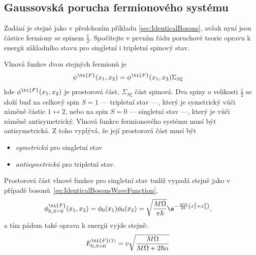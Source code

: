 \subsection{Gaussovská porucha fermionového systému}
\label{sec:GaussovskaPoruchaFermiony}
	Zadání je stejné jako v předchozím příkladu \ref{sec:IdenticalBosons}, avšak nyní jsou částice fermiony se spinem $\frac{1}{2}$.
	Spočítejte v prvním řádu poruchové teorie opravu k energii základního stavu pro singletní i tripletní spinový stav.
	
\begin{solution}
	Vlnová funkce dvou stejných fermionů je
	\begin{equation}
		\psi^{\ti{F}}(x_{1},x_{2})
			=\phi^{\ti{F}}(x_{1},x_{2})\Sigma_{S\xi}
	\end{equation}
	kde $\phi^{\ti{F}}(x_{1},x_{2})$ je prostorová část, $\Sigma_{S\xi}$ část spinová.
	Dva spiny o velikosti $\frac{1}{2}$ se složí buď na celkový spin $S=1$ --- tripletní stav ---, který je symetrický vůči záměně částic $1\leftrightarrow2$, nebo na spin $S=0$ --- singletní
	stav ---, který je vůči záměně antisymetrický.
	Vlnová funkce fermionového systému musí být antisymetrická.
	Z toho vyplývá, že její prostorová část musí být
	\begin{itemize}
		\item \emph{symetrická} pro singletní stav
		\item \emph{antisymetrická} pro tripletní stav.
	\end{itemize}
	Prostorová část vlnové funkce pro singletní stav tudíž vypadá stejně jako v případě bosonů~\eqref{eq:IdenticalBosonsWaveFunction},
	\begin{equation}
		\phi^{\ti{F}}_{0,S=0}(x_{1},x_{2})
			=\phi_{0}(x_{1})\phi_{0}(x_{2})
			=\sqrt{\frac{M\Omega}{\pi\hbar}}\e^{-\frac{M\Omega}{2\hbar}\left(x_{1}^{2}+x_{2}^{2}\right)},
	\end{equation}
	a tím pádem také oprava k energii vyjde stejně:
	\begin{equation}
		E_{0,S=0}^{\ti{F}(1)}
			=v\sqrt{\frac{M\Omega}{M\Omega+2\hbar\alpha}}
	\end{equation}
	

\end{solution}
